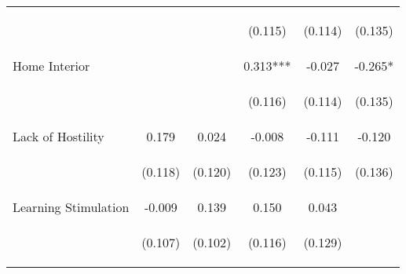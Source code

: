 \begin{tabular}{lccccc}
 & \begin{footnotesize}\end{footnotesize} & \begin{footnotesize}\end{footnotesize} & \begin{footnotesize}(0.115)\end{footnotesize} & \begin{footnotesize}(0.114)\end{footnotesize} & \begin{footnotesize}(0.135)\end{footnotesize}\\
\noalign{\smallskip}Home Interior &  &  & 0.313*** & -0.027 & -0.265*\\
 & \begin{footnotesize}\end{footnotesize} & \begin{footnotesize}\end{footnotesize} & \begin{footnotesize}(0.116)\end{footnotesize} & \begin{footnotesize}(0.114)\end{footnotesize} & \begin{footnotesize}(0.135)\end{footnotesize}\\
\noalign{\smallskip}Lack of Hostility & 0.179 & 0.024 & -0.008 & -0.111 & -0.120\\
 & \begin{footnotesize}(0.118)\end{footnotesize} & \begin{footnotesize}(0.120)\end{footnotesize} & \begin{footnotesize}(0.123)\end{footnotesize} & \begin{footnotesize}(0.115)\end{footnotesize} & \begin{footnotesize}(0.136)\end{footnotesize}\\
\noalign{\smallskip}Learning Stimulation & -0.009 & 0.139 & 0.150 & 0.043 & \\
 & \begin{footnotesize}(0.107)\end{footnotesize} & \begin{footnotesize}(0.102)\end{footnotesize} & \begin{footnotesize}(0.116)\end{footnotesize} & \begin{footnotesize}(0.129)\end{footnotesize} & \begin{footnotesize}\end{footnotesize}\\

\end{tabular}

